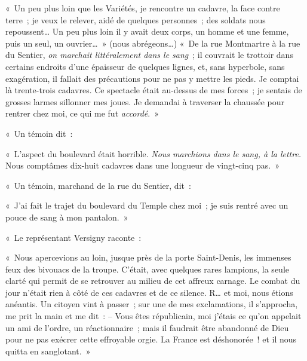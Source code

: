 \documentclass[french,twoside]{book} %
\newenvironment{quoteblock}%
  {\begin{quoting}}
  {\end{quoting}}
\newenvironment{quotebar}{%
    \def\FrameCommand{{\color{rubric!10!}\vrule width 0.5em} \hspace{0.9em}}%
    \def\OuterFrameSep{0pt} %
    \MakeFramed {\advance\hsize-\width \FrameRestore}
  }%
  {%
    \endMakeFramed
  }
\renewenvironment{quoteblock}%
  {%
    \savenotes
    \setstretch{0.9}
    \begin{quotebar}
    \smallskip
  }
  {%
    \smallskip
    \end{quotebar}
    \spewnotes
  }
\begin{document}
\begin{quoteblock}
 \noindent « Un peu plus loin que les Variétés, je rencontre un cadavre, la face contre terre ; je veux le relever, aidé de quelques personnes ; des soldats nous repoussent… Un peu plus loin il y avait deux corps, un homme et une femme, puis un seul, un ouvrier… » (nous abrégeons…) « De la rue Montmartre à la rue du Sentier, \emph{on marchait littéralement dans le sang} ; il couvrait le trottoir dans certains endroits d’une épaisseur de quelques lignes, et, sans hyperbole, sans exagération, il fallait des précautions pour ne pas y mettre les pieds. Je comptai là trente-trois cadavres. Ce spectacle était au-dessus de mes forces ; je sentais de grosses larmes sillonner mes joues. Je demandai à traverser la chaussée pour rentrer chez moi, ce qui me fut \emph{accordé}. »
 \end{quoteblock}

« Un témoin dit :\par

\begin{quoteblock}
 \noindent « L’aspect du boulevard était horrible. \emph{Nous marchions dans le sang, à la lettre.} Nous comptâmes dix-huit cadavres dans une longueur de vingt-cinq pas. »
 \end{quoteblock}

« Un témoin, marchand de la rue du Sentier, dit :\par

\begin{quoteblock}
 \noindent « J’ai fait le trajet du boulevard du Temple chez moi ; je suis rentré avec un pouce de sang à mon pantalon. »
 \end{quoteblock}

« Le représentant Versigny raconte :\par

\begin{quoteblock}
 \noindent « Nous apercevions au loin, jusque près de la porte Saint-Denis, les immenses feux des bivouacs de la troupe. C’était, avec quelques rares lampions, la seule clarté qui permit de se retrouver au milieu de cet affreux carnage. Le combat du jour n’était rien à côté de ces cadavres et de ce silence. R… et moi, nous étions anéantis. Un citoyen vint à passer ; sur une de mes exclamations, il s’approcha, me prit la main et me dit : – Vous êtes républicain, moi j’étais ce qu’on appelait un ami de l’ordre, un réactionnaire ; mais il faudrait être abandonné de Dieu pour ne pas exécrer cette effroyable orgie. La France est déshonorée ! et il nous quitta en sanglotant. »
 \end{quoteblock}
\end{document}

